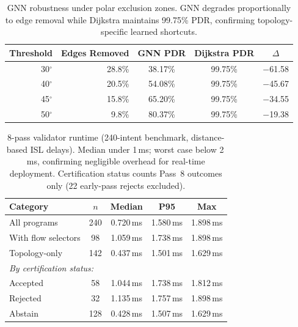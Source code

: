 \begin{table}[t]
\centering
\caption{GNN robustness under polar exclusion zones. GNN degrades proportionally to edge removal while Dijkstra maintains 99.75\% PDR, confirming topology-specific learned shortcuts.}
\label{tab:polar_exclusion}
\begin{tabular}{rrccc}
\toprule
\textbf{Threshold} & \textbf{Edges Removed} & \textbf{GNN PDR} & \textbf{Dijkstra PDR} & \textbf{$\Delta$} \\
\midrule
30$^\circ$ & 28.8\% & 38.17\% & 99.75\% & $-$61.58 \\
40$^\circ$ & 20.5\% & 54.08\% & 99.75\% & $-$45.67 \\
45$^\circ$ & 15.8\% & 65.20\% & 99.75\% & $-$34.55 \\
50$^\circ$ & 9.8\%  & 80.37\% & 99.75\% & $-$19.38 \\
\bottomrule
\end{tabular}
\end{table}

\begin{table}[t]
\centering
\caption{8-pass validator runtime (240-intent benchmark, distance-based ISL delays). Median under 1\,ms; worst case below 2\,ms, confirming negligible overhead for real-time deployment. Certification status counts Pass~8 outcomes only (22 early-pass rejects excluded).}
\label{tab:runtime}
\begin{tabular}{lcccc}
\toprule
\textbf{Category} & \textbf{$n$} & \textbf{Median} & \textbf{P95} & \textbf{Max} \\
\midrule
All programs        & 240 & 0.720\,ms & 1.580\,ms & 1.898\,ms \\
With flow selectors & 98  & 1.059\,ms & 1.738\,ms & 1.898\,ms \\
Topology-only       & 142 & 0.437\,ms & 1.501\,ms & 1.629\,ms \\
\midrule
\multicolumn{5}{l}{\textit{By certification status:}} \\
\quad Accepted      & 58  & 1.044\,ms & 1.738\,ms & 1.812\,ms \\
\quad Rejected      & 32  & 1.135\,ms & 1.757\,ms & 1.898\,ms \\
\quad Abstain       & 128 & 0.428\,ms & 1.507\,ms & 1.629\,ms \\
\bottomrule
\end{tabular}
\end{table}
